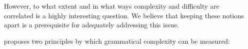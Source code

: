 \documentclass[output=collectionpaper]{langsci/langscibook}
\begin{document}
%
However, to what extent and in what ways complexity and difficulty are correlated is a highly interesting question. We believe that keeping these notions apart is a prerequisite for adequately addressing this issue.

\citet{Miestamo2006,Miestamo2008} proposes two principles by which grammatical complexity can be measured:
\end{document}
